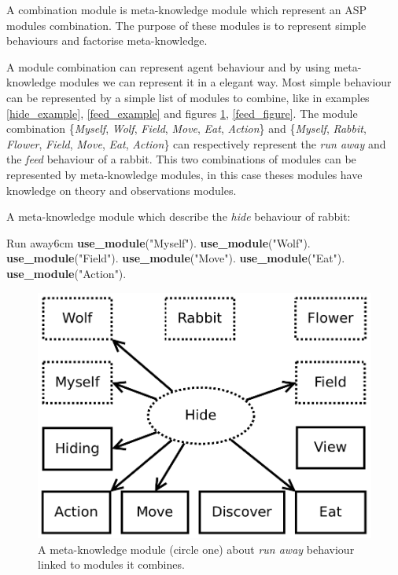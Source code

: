 \documentclass{aamas2012}
\begin{document}
	\begin{definition}
		A combination module is meta-knowledge module which represent an ASP modules combination.	
		The purpose of these modules is to represent simple behaviours and factorise meta-knowledge.
	\end{definition}
	
	A module combination can represent agent behaviour and by using meta-knowledge modules we can represent it in a elegant way.
	Most simple behaviour can be represented by a simple list of modules to combine, like in examples \ref{hide_example}, 
	\ref{feed_example} and figures \ref{hide_figure}, \ref{feed_figure}.
	The module combination \{\emph{Myself}, \emph{Wolf}, \emph{Field}, \emph{Move}, \emph{Eat}, \emph{Action}\} 
	and \{\emph{Myself}, \emph{Rabbit}, \emph{Flower}, \emph{Field},  \emph{Move}, \emph{Eat}, \emph{Action}\} 
	can respectively represent the \textit{run away} and the \textit{feed} behaviour of a rabbit.
	This two combinations of modules can be represented by meta-knowledge modules, in this case theses modules have knowledge on theory and observations modules.
	
	\begin{example}
		\label{hide_example}
		A meta-knowledge module which describe the \emph{hide} behaviour of rabbit:\newline
		\begin{module}{Run away}{6cm}
			\textbf{use\_module}("Myself").\newline
			\textbf{use\_module}("Wolf").\newline
			\textbf{use\_module}("Field").\newline
			\textbf{use\_module}("Move").\newline
			\textbf{use\_module}("Eat").\newline
			\textbf{use\_module}("Action").
		\end{module}
	\end{example}
	
	\begin{figure}
		\centering
		\includegraphics[keepaspectratio=true, scale=0.4]{hide.pdf}
		\caption
		{
			\label{hide_figure}
			A meta-knowledge module (circle one) about \textit{run away} behaviour linked to modules it combines.
		}
	\end{figure}
	
\end{document}

